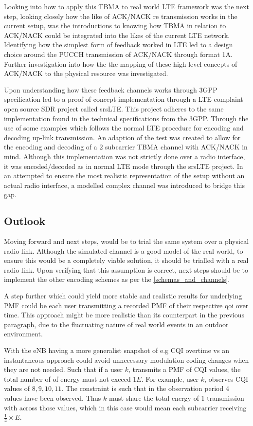 \documentclass{article}
\begin{document}
Looking into how to apply this TBMA to real world LTE framework was the next step, looking closely how the like of ACK/NACK re transmission works in the current setup, was the introductions to knowing how TBMA in relation to ACK/NACK could be integrated into the likes of the current LTE network. Identifying how the simplest form of feedback worked in LTE led to a design choice around the PUCCH transmission of ACK/NACK through format 1A. Further investigation into how the the  mapping of these high level concepts of ACK/NACK to the physical resource was investigated. 

Upon understanding how these feedback channels works through 3GPP specification led to a proof of concept implementation through a LTE complaint open source SDR project called srsLTE. This project adheres to the same implementation found in the technical specifications from the 3GPP. Through the use of some examples which follows the normal LTE procedure for encoding and decoding up-link transmission. An adaption of the test was created to allow for the encoding and decoding of a 2 subcarrier TBMA channel with ACK/NACK in mind. Although this implementation was not strictly done over a radio interface, it was encoded/decoded as in normal LTE mode through the srsLTE project. In an attempted to ensure the most realistic representation of the setup without an actual radio interface, a modelled complex channel was introduced to bridge this gap. 


\subsection{Outlook}
Moving forward and next steps, would be to trial the same system over a physical radio link. Although the simulated channel is a good model of the real world, to ensure this would be a completely viable solution, it should be trialled with a real radio link. Upon verifying that this assumption is correct, next steps should be to implement the other encoding schemes as per the \cref{schemas_and_channels}. 

A step further which could yield more stable and realistic results for underlying PMF could be each user transmitting a recorded PMF of their respective \ac{qoi} over time. This approach might be more realistic than its counterpart in the previous paragraph, due to the fluctuating nature of real world events in an outdoor environment. 

With the eNB having a more generalist snapshot of e.g CQI overtime vs an instantaneous approach could avoid unnecessary modulation coding changes when they are not needed. Such that if a user $k$, transmits a PMF of CQI values, the total number of of energy must not exceed $1E$. For example, user $k$, observes \ac{CQI} values of $8,9,10,11$. The constraint is such that in the observation period  4 values have been observed. Thus $k$ must share the total energy of 1 transmission with across those values, which in this case would mean each subcarrier receiving $\frac{1}{4} \times E$.
\end{document}
